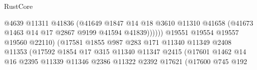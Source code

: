 \begin{lexlean}{RustCore}
\begin{coremodule}
                                              @4639
                                              @11311
                                              @41836
                                              (@41649
                                                @1847
                                                @14
                                                @18
                                                @3610
                                                @11310
                                                @41658
                                                (@41673
                                                  @1463
                                                  @14
                                                  @17
                                                  @2867
                                                  @9199
                                                  @41594
                                                  @41839))))))
                                      @19551
                                      @19554
                                      @19557
                                      @19560
                                      @22110)
                                    (@17581
                                      @1855
                                      @987
                                      @283
                                      @171
                                      @11340
                                      @11349
                                      @2408
                                      @11353
                                      (@17592
                                        @1854
                                        @17
                                        @315
                                        @11340
                                        @11347
                                        @2415
                                        (@17601
                                          @1462
                                          @14
                                          @16
                                          @2395
                                          @11339
                                          @11346
                                          @2386
                                          @11322
                                          @2392
                                          @17621
                                          (@17600
                                            @745
                                            @192

\end{coremodule}
\end{lexlean}
